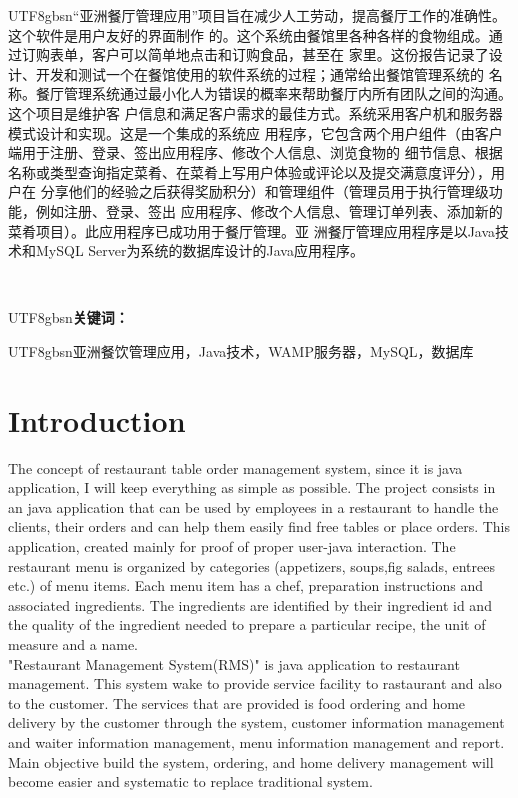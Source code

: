 \documentclass[12pt,a4paper]{article}
\newcommand{\zh}[1]{\begin{CJK}{UTF8}{gbsn}#1\end{CJK}}
\newcommand\tab[1][1cm]{\hspace*{#1}}
\begin{document}
\begin{titlepage}
	\zh{“亚洲餐厅管理应用”项目旨在减少人工劳动，提高餐厅工作的准确性。这个软件是用户友好的界面制作
的。这个系统由餐馆里各种各样的食物组成。通过订购表单，客户可以简单地点击和订购食品，甚至在
家里。这份报告记录了设计、开发和测试一个在餐馆使用的软件系统的过程；通常给出餐馆管理系统的
名称。餐厅管理系统通过最小化人为错误的概率来帮助餐厅内所有团队之间的沟通。这个项目是维护客
户信息和满足客户需求的最佳方式。系统采用客户机和服务器模式设计和实现。这是一个集成的系统应
用程序，它包含两个用户组件（由客户端用于注册、登录、签出应用程序、修改个人信息、浏览食物的
细节信息、根据名称或类型查询指定菜肴、在菜肴上写用户体验或评论以及提交满意度评分），用户在
分享他们的经验之后获得奖励积分）和管理组件（管理员用于执行管理级功能，例如注册、登录、签出
应用程序、修改个人信息、管理订单列表、添加新的菜肴项目）。此应用程序已成功用于餐厅管理。亚
洲餐厅管理应用程序是以Java技术和MySQL Server为系统的数据库设计的Java应用程序。\linebreak}\\

\RaggedRight\zh{\bfseries{关键词：}}\zh{亚洲餐饮管理应用，Java技术，WAMP服务器，MySQL，数据库}
	\end{titlepage}
	
	\newpage
	\tableofcontents
	\newpage
	\listoffigures
	\newpage
	\listoftables
	
	\newpage
	
	\section{Introduction}
	\tab The concept of restaurant table order management system, since it is java application, I will keep everything as simple as possible. The project consists in an java application that can be used by employees in a restaurant to handle the clients, their orders and can help them easily find free tables or place orders. This application, created mainly for proof of proper user-java interaction. The restaurant menu is organized by categories (appetizers, soups,fig salads, entrees etc.) of menu items. Each menu item has a chef, preparation instructions and associated ingredients. The ingredients are identified by their ingredient id and the quality of the ingredient needed to prepare a particular recipe, the unit of measure and a name.
\\
\tab "Restaurant Management System(RMS)" is java application to restaurant management. This system wake to provide service facility to rastaurant and also to the customer. The services that are provided is food ordering and home delivery by the customer through the system, customer information management and waiter information management, menu information management and report. Main objective build the system, ordering, and home delivery management will become easier and systematic to replace traditional system.
\end{document}
